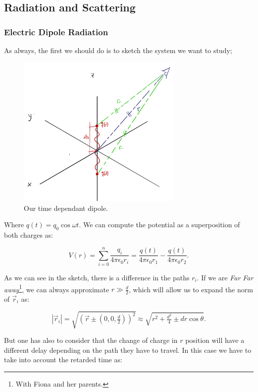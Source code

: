 \subsection{Radiation and Scattering}

\subsubsection{Electric Dipole Radiation}\label{Electric Dipole Radiation}

As always, the first we should do is to sketch the system we want to study;

\begin{figure}[h]
	\includegraphics[width=8cm]{figures/Dipolerad.png}
	\centering
	\caption{Our time dependant dipole.}
\end{figure}

Where $q(t)= q_{0} \cos \omega t$. We can compute the potential as a superposition of both charges as:

\begin{equation}
	V(r) = \sum_{i=0}^{n} \frac{q_{i}}{4\pi \epsilon_{0}r_{i}}=\frac{q(t)}{4\pi \epsilon_{0}r_{1}} - \frac{q(t)}{4\pi \epsilon_{0}r_{2}}.
\end{equation}

As we can see in the sketch, there is a difference in the paths $r_{i}$. If we are \textit{Far Far away}\footnote{With Fiona and her parents.}, we can always approximate $r \gg \tfrac{d}{2}$, which will allow us to expand the norm of $\vec{r}_{i}$ as:

\begin{equation}
	|\vec{r}_{i}| = \sqrt{(\vec{r} \pm (0,0,\tfrac{d}{2}))^{2}} \approx \sqrt{r^{2} + \tfrac{d^{2}}{4} \pm d r \cos \theta}.
\end{equation}

But one has also to consider that the change of charge in $r$ position will have a different delay depending on the path they have to travel. In this case we have to take into account the retarded time as:

